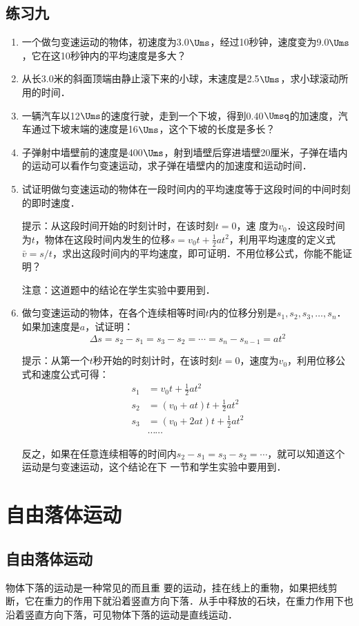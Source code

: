 \subsection*{练习九}
\begin{enumerate}
\item 一个做匀变速运动的物体，初速度为3.0$\Ums$，经过10秒钟，速度变为9.0$\Ums$，它在这10秒钟内的平均速度是多大？
\item 从长3.0米的斜面顶端由静止滚下来的小球，末速度是2.5$\Ums$，求小球滚动所用的时间．
\item 一辆汽车以12$\Ums$的速度行驶，走到一个下坡，得到0.40$\Umsq$的加速度，汽车通过下坡末端的速度是16$\Ums$，这个下坡的长度是多长？
\item 子弹射中墙壁前的速度是400$\Ums$，射到墙壁后穿进墙壁20厘米，子弹在墙内的运动可以看作匀变速运动，求子弹在墙壁内的加速度和运动时间．
\item 试证明做匀变速运动的物体在一段时间内的平均速度等于这段时间的中间时刻的即时速度．

提示：从这段时间开始的时刻计时，在该时刻$t=0$，速
度为$v_0$．设这段时间为$t$，物体在这段时间内发生的位移$s=v_0t +\frac{1}{2}at^2$，利用平均速度的定义式$\bar v=s/t$，求出这段时间内的平均速度，即可证明．不用位移公式，你能不能证明？

注意：这道题中的结论在学生实验中要用到．

\item 做匀变速运动的物体，在各个连续相等时间$t$内的位移分别是$s_1, s_2, s_3,\ldots,s_n$．如果加速度是$a$，试证明：
\[\Delta s=s_2-s_1=s_3-s_2=\cdots=s_n-s_{n-1}=at^2 \]

提示：从第一个$t$秒开始的时刻计时，在该时刻$t=0$，速度为$v_0$，利用位移公式和速度公式可得：
\[\begin{split}
s_1&=v_0t +\frac{1}{2}at^2\\
s_2&=(v_0+at)t +\frac{1}{2}at^2\\
s_3&=(v_0+2at)t +\frac{1}{2}at^2\\
&\cdots\cdots
\end{split} \]

反之，如果在任意连续相等的时间内$s_2-s_1=s_3-s_2=\cdots$，就可以知道这个运动是匀变速运动，这个结论在下
一节和学生实验中要用到．
\end{enumerate}

\section{自由落体运动}
\subsection{自由落体运动}
物体下落的运动是一种常见的而且重
要的运动，挂在线上的重物，如果把线剪断，它在重力的作用下就沿着竖直方向下落．从手中释放的石块，在重力作用下也沿着竖直方向下落，可见物体下落的运动是直线运动．

